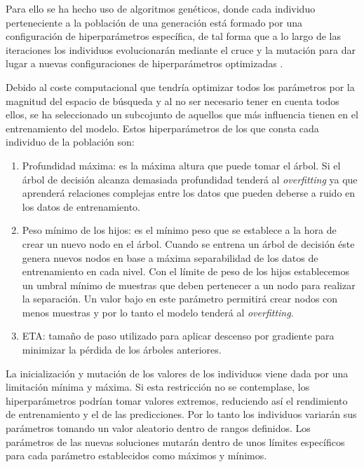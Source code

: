         Para ello se ha hecho uso de algoritmos genéticos, donde cada individuo perteneciente a la población de una generación está formado por una configuración de hiperparámetros específica, de tal forma que a lo largo de las iteraciones los individuos evolucionarán mediante el cruce y la mutación para dar lugar a nuevas configuraciones de hiperparámetros optimizadas \cite{GAXGBoostPaper}.

        Debido al coste computacional que tendría optimizar todos los parámetros por la magnitud del espacio de búsqueda y al no ser necesario tener en cuenta todos ellos, se ha seleccionado un subcojunto de aquellos que más influencia tienen en el entrenamiento del modelo. Estos hiperparámetros de los que consta cada individuo de la población son:

        \begin{enumerate}

            \item Profundidad máxima: es la máxima altura que puede tomar el árbol. Si el árbol de decisión alcanza demasiada profundidad tenderá al \textit{overfitting} ya que aprenderá relaciones complejas entre los datos que pueden deberse a ruido en los datos de entrenamiento.

            \item Peso mínimo de los hijos: es el mínimo peso que se establece a la hora de crear un nuevo nodo en el árbol. Cuando se entrena un árbol de decisión éste genera nuevos nodos en base a máxima separabilidad de los datos de entrenamiento en cada nivel. Con el límite de peso de los hijos establecemos un umbral mínimo de muestras que deben pertenecer a un nodo para realizar la separación. Un valor bajo en este parámetro permitirá crear nodos con menos muestras y por lo tanto el modelo tenderá al \textit{overfitting}.

            \item ETA: tamaño de paso utilizado para aplicar descenso por gradiente para minimizar la pérdida de los árboles anteriores.

        \end{enumerate}

        La inicialización y mutación de los valores de los individuos viene dada por una limitación mínima y máxima. Si esta restricción no se contemplase, los hiperparámetros podrían tomar valores extremos, reduciendo así el rendimiento de entrenamiento y el de las predicciones. Por lo tanto los individuos variarán sus parámetros tomando un valor aleatorio dentro de rangos definidos. Los parámetros de las nuevas soluciones mutarán dentro de unos límites específicos para cada parámetro establecidos como máximos y mínimos.

